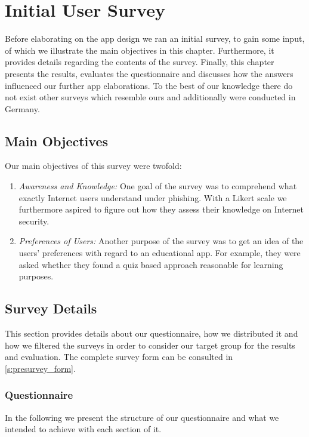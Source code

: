 \section{Initial User Survey}
\label{s:survey}
Before elaborating on the app design we ran an initial survey, to gain some input, of which we illustrate the main objectives in this chapter.
 Furthermore, it provides details regarding the contents of the survey.
Finally, this chapter presents the results, evaluates the questionnaire and discusses how the answers influenced our further app elaborations.
 To the best of our knowledge there do not exist other surveys which resemble ours and additionally were conducted in Germany.

\subsection{Main Objectives}
Our main objectives of this survey were twofold:

\begin{enumerate}
	\item \textit{Awareness and Knowledge:} One goal of the survey was to comprehend what exactly Internet users understand under phishing.
 With a Likert scale we furthermore aspired to figure out how they assess their knowledge on Internet security.

	\item \textit{Preferences of Users:} Another purpose of the survey was to get an idea of the users' preferences with regard to an educational app.
 For example, they were asked whether they found a quiz based approach reasonable for learning purposes.

\end{enumerate}
\subsection{Survey Details}
This section provides details about our questionnaire, how we distributed it and how we filtered the surveys in order to consider our target group for the results and evaluation.
The complete survey form can be consulted in \autoref{s:presurvey_form}.

\subsubsection{Questionnaire}
In the following we present the structure of our questionnaire and what we intended to achieve with each section of it.
 
